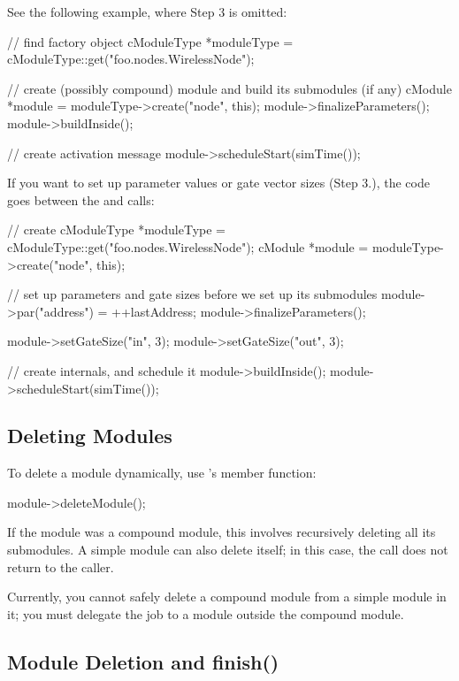 See the following example, where Step 3 is omitted:

\begin{cpp}
// find factory object
cModuleType *moduleType = cModuleType::get("foo.nodes.WirelessNode");

// create (possibly compound) module and build its submodules (if any)
cModule *module = moduleType->create("node", this);
module->finalizeParameters();
module->buildInside();

// create activation message
module->scheduleStart(simTime());
\end{cpp}

If you want to set up parameter values or gate vector sizes (Step 3.),
the code goes between the  and
 calls:

\begin{cpp}
// create
cModuleType *moduleType = cModuleType::get("foo.nodes.WirelessNode");
cModule *module = moduleType->create("node", this);

// set up parameters and gate sizes before we set up its submodules
module->par("address") = ++lastAddress;
module->finalizeParameters();

module->setGateSize("in", 3);
module->setGateSize("out", 3);

// create internals, and schedule it
module->buildInside();
module->scheduleStart(simTime());
\end{cpp}


\subsection{Deleting Modules}

To delete a module dynamically, use
's  member function:

\begin{cpp}
module->deleteModule();
\end{cpp}

If the module was a compound module, this involves recursively
deleting all its submodules. A simple module can also delete itself;
in this case, the  call does not return to the
caller.

Currently, you cannot safely delete a compound module from a simple module
in it; you must delegate the job to a module outside the compound
module.


\subsection{Module Deletion and finish()}

